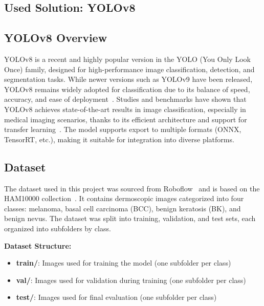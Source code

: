 \documentclass[a4paper,12pt]{report}
\begin{document}
\begin{spacing}{1.5}
\newpage

\chapter{Used Solution: YOLOv8}
    
    \section{YOLOv8 Overview}
    YOLOv8 is a recent and highly popular version in the YOLO (You Only Look Once) family, designed for high-performance image classification, detection, and segmentation tasks. While newer versions such as YOLOv9 have been released, YOLOv8 remains widely adopted for classification due to its balance of speed, accuracy, and ease of deployment~\cite{ultralytics23}. Studies and benchmarks have shown that YOLOv8 achieves state-of-the-art results in image classification, especially in medical imaging scenarios, thanks to its efficient architecture and support for transfer learning~\cite{ultralytics23,elgendi2023diagnostics}. The model supports export to multiple formats (ONNX, TensorRT, etc.), making it suitable for integration into diverse platforms.
    
    \section{Dataset}
    The dataset used in this project was sourced from Roboflow~\cite{roboflow24} and is based on the HAM10000 collection~\cite{intro5}. It contains dermoscopic images categorized into four classes: melanoma, basal cell carcinoma (BCC), benign keratosis (BK), and benign nevus. The dataset was split into training, validation, and test sets, each organized into subfolders by class.

    \textbf{Dataset Structure:}
    \begin{itemize}
        \item \textbf{train/}: Images used for training the model (one subfolder per class)
        \item \textbf{val/}: Images used for validation during training (one subfolder per class)
        \item \textbf{test/}: Images used for final evaluation (one subfolder per class)
    \end{itemize}


\end{spacing}
\end{document}
